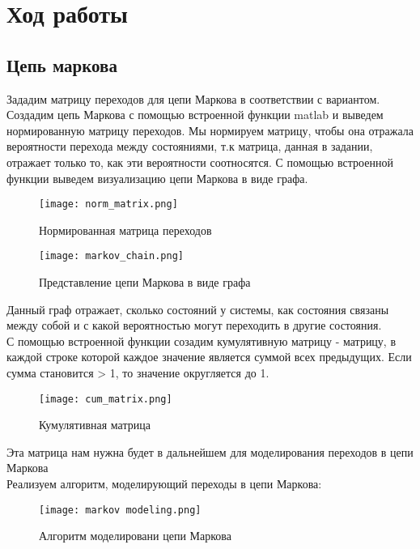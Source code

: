 \chapter{Ход работы}
\label{ch:chap2}

\section*{\textbf{Цепь маркова}}
Зададим матрицу переходов для цепи Маркова в соответствии с вариантом. Создадим цепь Маркова с помощью встроенной функции matlab
и выведем нормированную матрицу переходов. Мы нормируем матрицу, чтобы она отражала вероятности перехода между состояниями,
т.к матрица, данная в задании, отражает только то, как эти вероятности соотносятся. С помощью встроенной функции выведем визуализацию 
цепи Маркова в виде графа.

\begin{figure}[H]
    \centering
    \texttt{[image: norm\_matrix.png]}
    \caption{Нормированная матрица переходов}
\end{figure}

\begin{figure}[H]
    \centering
    \texttt{[image: markov\_chain.png]}
    \caption{Представление цепи Маркова в виде графа}
\end{figure}

Данный граф отражает, сколько состояний у системы, как состояния связаны между собой и с какой вероятностью могут переходить в 
другие состояния. \\

С помощью встроенной функции созадим кумулятивную матрицу - матрицу, в каждой строке которой каждое значение является суммой всех 
предыдущих. Если сумма становится > 1, то значение округляется до 1.

\begin{figure}[H]
    \centering
    \texttt{[image: cum\_matrix.png]}
    \caption{Кумулятивная матрица}
\end{figure}

Эта матрица нам нужна будет в дальнейшем для моделирования переходов в цепи Маркова \\

Реализуем алгоритм, моделирующий переходы в цепи Маркова:

\begin{figure}[H]
    \centering
    \texttt{[image: markov modeling.png]}
    \caption{Алгоритм моделировани цепи Маркова}
\end{figure}

